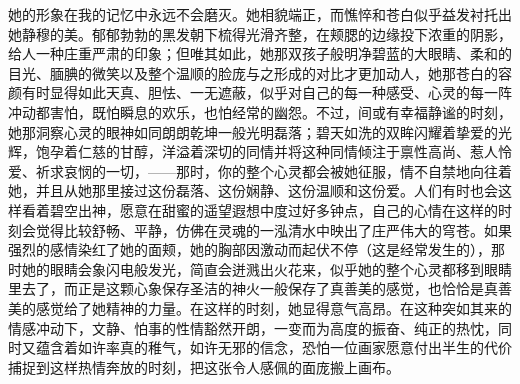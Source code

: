\documentclass[12pt, UTF8]{ctexbook}
\begin{document}
\par 她的形象在我的记忆中永远不会磨灭。她相貌端正，而憔悴和苍白似乎益发衬托出她静穆的美。郁郁勃勃的黑发朝下梳得光滑齐整，在颊腮的边缘投下浓重的阴影，给人一种庄重严肃的印象；但唯其如此，她那双孩子般明净碧蓝的大眼睛、柔和的目光、腼腆的微笑以及整个温顺的脸庞与之形成的对比才更加动人，她那苍白的容颜有时显得如此天真、胆怯、一无遮蔽，似乎对自己的每一种感受、心灵的每一阵冲动都害怕，既怕瞬息的欢乐，也怕经常的幽怨。不过，间或有幸福静谧的时刻，她那洞察心灵的眼神如同朗朗乾坤一般光明磊落；碧天如洗的双眸闪耀着挚爱的光辉，饱孕着仁慈的甘醇，洋溢着深切的同情并将这种同情倾注于禀性高尚、惹人怜爱、祈求哀悯的一切，——那时，你的整个心灵都会被她征服，情不自禁地向往着她，并且从她那里接过这份磊落、这份娴静、这份温顺和这份爱。人们有时也会这样看着碧空出神，愿意在甜蜜的遥望遐想中度过好多钟点，自己的心情在这样的时刻会觉得比较舒畅、平静，仿佛在灵魂的一泓清水中映出了庄严伟大的穹苍。如果强烈的感情染红了她的面颊，她的胸部因激动而起伏不停（这是经常发生的），那时她的眼睛会象闪电般发光，简直会迸溅出火花来，似乎她的整个心灵都移到眼睛里去了，而正是这颗心象保存圣洁的神火一般保存了真善美的感觉，也恰恰是真善美的感觉给了她精神的力量。在这样的时刻，她显得意气高昂。在这种突如其来的情感冲动下，文静、怕事的性情豁然开朗，一变而为高度的振奋、纯正的热忱，同时又蕴含着如许率真的稚气，如许无邪的信念，恐怕一位画家愿意付出半生的代价捕捉到这样热情奔放的时刻，把这张令人感佩的面庞搬上画布。
\end{document}
